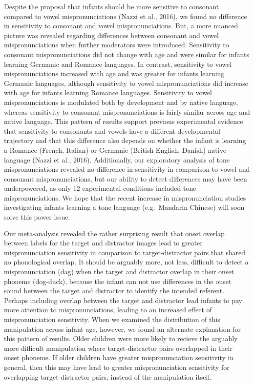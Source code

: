 \documentclass[man]{apa6}
\begin{document}
Despite the proposal that infants should be more sensitive to consonant compared to vowel mispronunciations (Nazzi et al., 2016), we found no difference in sensitivity to consonant and vowel mispronunciations. But, a more nuanced picture was revealed regarding differences between consonant and vowel mispronunciations when further moderators were introduced. Sensitivity to consonant mispronunciations did not change with age and were similar for infants learning Germanic and Romance languages. In contrast, sensitivity to vowel mispronunciations increased with age and was greater for infants learning Germanic languages, although sensitivity to vowel mispronunciations did increase with age for infants learning Romance languages. Sensitivity to vowel mispronunciations is modulated both by development and by native language, whereas sensitivity to consonant mispronunciations is fairly similar across age and native language. This pattern of results support previous experimental evidence that sensitivity to consonants and vowels have a different developmental trajectory and that this difference also depends on whether the infant is learning a Romance (French, Italian) or Germanic (British English, Danish) native language (Nazzi et al., 2016). Additionally, our exploratory analysis of tone mispronunciations revealed no difference in sensitivity in comparison to vowel and consonant mispronunciations, but our ability to detect differences may have been underpowered, as only 12 experimental conditions included tone mispronunciations. We hope that the recent increase in mispronunciation studies investigating infants learning a tone language (e.g.~Mandarin Chinese) will soon solve this power issue.

Our meta-analysis revealed the rather surprising result that onset overlap between labels for the target and distractor images lead to greater mispronunciation sensitivity in comparison to target-distractor pairs that shared no phonological overlap. It should be arguably more, not less, difficult to detect a mispronunciation (dag) when the target and distractor overlap in their onset phoneme (dog-duck), because the infant can not use differences in the onset sound between the target and distractor to identify the intended referent. Perhaps including overlap between the target and distractor lead infants to pay more attention to mispronunciations, leading to an increased effect of mispronunciation sensitivity. When we examined the distribution of this manipulation across infant age, however, we found an alternate explanation for this pattern of results. Older children were more likely to recieve the arguably more difficult manipulation where target-distractor pairs overlapped in their onset phoneme. If older children have greater mispronunciation sensitivity in general, then this may have lead to greater mispronunciation sensitivity for overlapping target-distractor pairs, instead of the manipulation itself.
\end{document}
